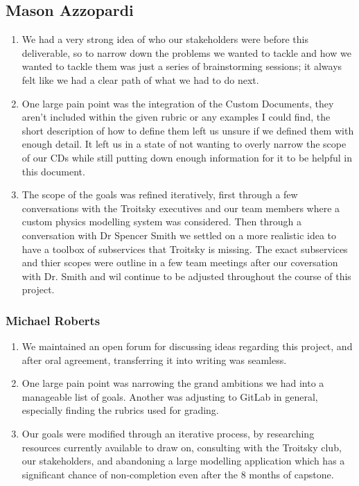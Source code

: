 \documentclass{article}
\begin{document}
\subsection*{Mason Azzopardi}
\begin{enumerate}
    \item We had a very strong idea of who our stakeholders were before this deliverable, so to narrow down the problems we wanted to tackle and how we wanted to tackle them was just a series of brainstorming sessions; it always felt like we had a clear path of what we had to do next.
    \item One large pain point was the integration of the Custom Documents, they aren't included within the given rubric or any examples I could find, the short description of how to define them left us unsure if we defined them with enough detail. It left us in a state of not wanting to overly narrow the scope of our CDs while still putting down enough information for it to be helpful in this document.
    \item The scope of the goals was refined iteratively, first through a few conversations with the Troitsky executives and our team members where a custom physics modelling system was considered. Then through a conversation with Dr Spencer Smith we settled on a more realistic idea to have a toolbox of subservices that Troitsky is missing. The exact subservices and thier scopes were outline in a few team meetings after our coversation with Dr. Smith and wil continue to be adjusted throughout the course of this project.
\end{enumerate}

\subsubsection*{Michael Roberts}

\begin{enumerate}
    \item We maintained an open forum for discussing ideas regarding this project, and after oral agreement, transferring it into writing was seamless.
    \item One large pain point was narrowing the grand ambitions we had into a manageable list of goals. Another was adjusting to
     GitLab in general, especially finding the rubrics used for grading.
     \item Our goals were modified through an iterative process, by researching resources currently
      available to draw on, consulting with the Troitsky club, our stakeholders, and abandoning a large modelling
      application which has a significant chance of non-completion even after the 8 months of capstone.
\end{enumerate}
\end{document}
